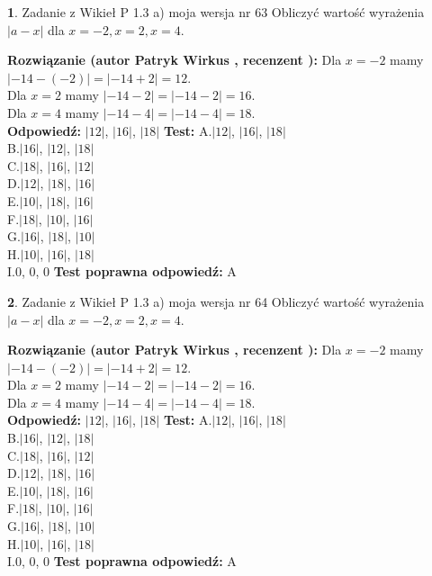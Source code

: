 \documentclass[12pt, a4paper]{article}
\theoremstyle{definition} %
\newtheorem{zad}{}
\newcommand{\zadStart}[1]{\begin{zad}#1\newline}
\newcommand{\zadStop}{\end{zad}}
\newcommand{\rozwStart}[2]{\noindent \textbf{Rozwiązanie (autor #1 , recenzent #2): }\newline}
\newcommand{\rozwStop}{\newline}
\newcommand{\odpStart}{\noindent \textbf{Odpowiedź:}\newline}
\newcommand{\odpStop}{\newline}
\newcommand{\testStart}{\noindent \textbf{Test:}\newline}
\newcommand{\testStop}{\newline}
\newcommand{\kluczStart}{\noindent \textbf{Test poprawna odpowiedź:}\newline}
\newcommand{\kluczStop}{\newline}
\begin{document}
\zadStart{Zadanie z Wikieł P 1.3 a) moja wersja nr 63}
Obliczyć wartość wyrażenia $|a - x|$ dla $x=-2,x=2,x=4$.
\zadStop
\rozwStart{Patryk Wirkus}{}
Dla $x = -2$ mamy $|-14 - (-2)| = |-14 + 2| = 12$.\\
Dla $x = 2$ mamy $|-14 - 2| = |-14 - 2| = 16$.\\
Dla $x = 4$ mamy $|-14 - 4| = |-14 - 4| = 18$.\\
\rozwStop
\odpStart
$|12|$, $|16|$, $|18|$
\odpStop
\testStart
A.$|12|$, $|16|$, $|18|$\\
B.$|16|$, $|12|$, $|18|$\\
C.$|18|$, $|16|$, $|12|$\\
D.$|12|$, $|18|$, $|16|$\\
E.$|10|$, $|18|$, $|16|$\\
F.$|18|$, $|10|$, $|16|$\\
G.$|16|$, $|18|$, $|10|$\\
H.$|10|$, $|16|$, $|18|$\\
I.$0$, $0$, $0$
\testStop
\kluczStart
A
\kluczStop



\zadStart{Zadanie z Wikieł P 1.3 a) moja wersja nr 64}
Obliczyć wartość wyrażenia $|a - x|$ dla $x=-2,x=2,x=4$.
\zadStop
\rozwStart{Patryk Wirkus}{}
Dla $x = -2$ mamy $|-14 - (-2)| = |-14 + 2| = 12$.\\
Dla $x = 2$ mamy $|-14 - 2| = |-14 - 2| = 16$.\\
Dla $x = 4$ mamy $|-14 - 4| = |-14 - 4| = 18$.\\
\rozwStop
\odpStart
$|12|$, $|16|$, $|18|$
\odpStop
\testStart
A.$|12|$, $|16|$, $|18|$\\
B.$|16|$, $|12|$, $|18|$\\
C.$|18|$, $|16|$, $|12|$\\
D.$|12|$, $|18|$, $|16|$\\
E.$|10|$, $|18|$, $|16|$\\
F.$|18|$, $|10|$, $|16|$\\
G.$|16|$, $|18|$, $|10|$\\
H.$|10|$, $|16|$, $|18|$\\
I.$0$, $0$, $0$
\testStop
\kluczStart
A
\kluczStop
\end{document}
